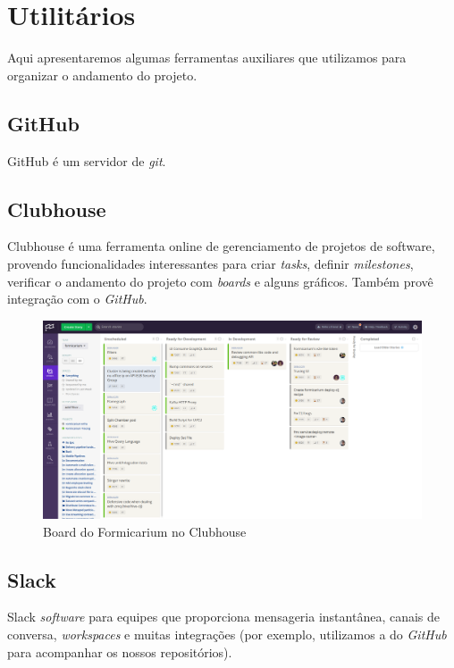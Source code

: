     \section{Utilitários}
    Aqui apresentaremos algumas ferramentas auxiliares que utilizamos para organizar o andamento do projeto.

        \subsection{GitHub}
            GitHub \cite{github} é um servidor de \textit{git}.

        \subsection{Clubhouse}
            Clubhouse \cite{clubhouse} é uma ferramenta online de gerenciamento de projetos de software, provendo funcionalidades interessantes para criar \textit{tasks}, definir \textit{milestones}, verificar o andamento do projeto com \textit{boards} e alguns gráficos. Também provê integração com o \textit{GitHub}.

            \begin{figure}[htb]
                \caption{Board do Formicarium no Clubhouse}
                \begin{center}
                    \includegraphics[scale=0.20]{pictures/clubhouse-fmc.png}
                \end{center}
                \label{fig:clubhouse}
            \end{figure}

        \subsection{Slack}
            Slack \cite{slack} \textit{software} para equipes que proporciona mensageria instantânea, canais de conversa, \textit{workspaces} e muitas integrações (por exemplo, utilizamos a do \textit{GitHub} para acompanhar os nossos repositórios).
    